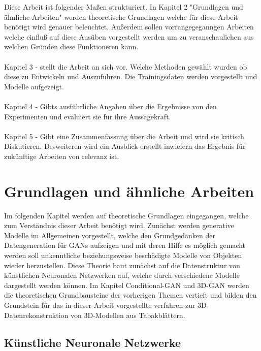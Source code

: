 \documentclass{llncs}
\begin{document}
Diese Arbeit ist folgender Maßen strukturiert. In Kapitel 2 "Grundlagen und ähnliche Arbeiten" werden theoretische Grundlagen welche für diese Arbeit benötigt wird genauer beleuchtet. Außerdem sollen vorrangegeganngen Arbeiten welche einfluß auf diese Ausüben vorgestellt werden um zu veranschaulichen aus welchen Gründen diese Funktioneren kann.
\\\\
Kapitel 3 - stellt die Arbeit an sich vor. Welche Methoden gewählt wurden ob diese zu Entwickeln und Auszuführen. Die Trainingsdaten werden vorgestellt und Modelle aufgezeigt.
\\\\
Kapitel 4 - Gibts  ausführliche Angaben über die Ergebnisse von den Experimenten und evaluiert sie für ihre Aussagekraft.
\\\\
Kapitel 5 - Gibt eine Zusammenfassung über die Arbeit und wird sie kritisch Diskutieren. Desweiteren wird ein Ausblick erstellt inwiefern das Ergebnis für zukünftige Arbeiten von relevanz ist. 

\section{Grundlagen und ähnliche Arbeiten}

Im folgenden Kapitel werden auf theoretische Grundlagen eingegangen, welche zum Verständnis dieser Arbeit benötigt wird. Zunächst werden generative Modelle im Allgemeinen vorgestellt, welche den Grundgedanken der Datengeneration für GANs aufzeigen und mit deren Hilfe es möglich gemacht werden soll unkenntliche beziehungsweise beschädigte Modelle von Objekten wieder herzustellen. Diese Theorie baut zunächst auf die Datenstruktur von künstlichen Neuronalen Netzwerken auf, welche durch verschiedene Modelle dargestellt werden können. Im Kapitel Conditional-GAN und 3D-GAN werden die theoretischen Grundbausteine der vorherigen Themen vertieft und bilden den Grundstein für das in dieser Arbeit vorgestellte verfahren zur 3D-Datenrekonstruktion von 3D-Modellen aus Tabakblättern. 

\subsection{Künstliche Neuronale Netzwerke}
\end{document}
